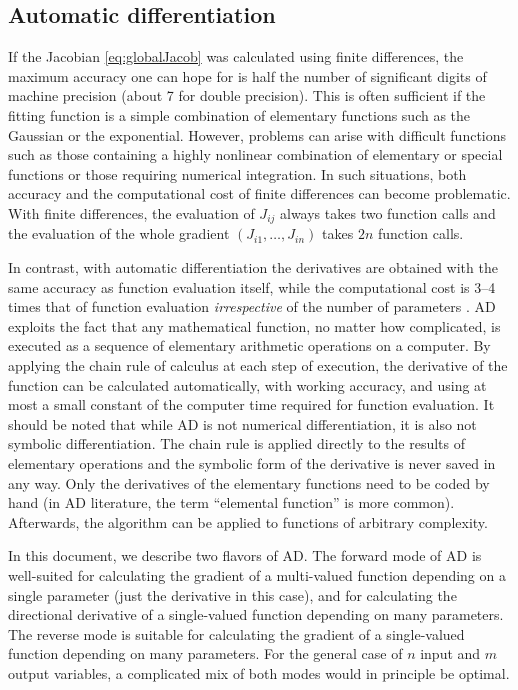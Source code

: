 \documentclass{article}
\begin{document}
\subsection{\label{sec:ad}Automatic differentiation}

If the Jacobian \eqref{eq:globalJacob} was calculated using finite
differences, the maximum accuracy one can hope for is half the number
of significant digits of machine precision (about 7 for double
precision). This is often sufficient if the fitting function is a
simple combination of elementary functions such as the Gaussian or the
exponential. However, problems can arise with difficult functions such
as those containing a highly nonlinear combination of elementary or
special functions or those requiring numerical integration. In such
situations, both accuracy and the computational cost of finite
differences can become problematic. With finite differences, the
evaluation of $J_{ij}$ always takes two function calls and the
evaluation of the whole gradient $(J_{i1}, \ldots, J_{in})$ takes $2n$
function calls.

In contrast, with automatic differentiation the derivatives are
obtained with the same accuracy as function evaluation itself, while
the computational cost is 3--4 times that of function evaluation
\textit{irrespective} of the number of parameters
\cite{griewank08}. AD exploits the fact that any mathematical
function, no matter how complicated, is executed as a sequence of
elementary arithmetic operations on a computer. By applying the chain
rule of calculus at each step of execution, the derivative of the
function can be calculated automatically, with working accuracy, and
using at most a small constant of the computer time required for
function evaluation. It should be noted that while AD is not numerical
differentiation, it is also not symbolic differentiation. The chain
rule is applied directly to the results of elementary operations and
the symbolic form of the derivative is never saved in any way. Only
the derivatives of the elementary functions need to be coded by hand
(in AD literature, the term ``elemental function'' is more
common). Afterwards, the algorithm can be applied to functions of
arbitrary complexity.

In this document, we describe two flavors of AD. The forward mode of
AD is well-suited for calculating the gradient of a multi-valued
function depending on a single parameter (just the derivative in this
case), and for calculating the directional derivative of a
single-valued function depending on many parameters. The reverse mode
is suitable for calculating the gradient of a single-valued function
depending on many parameters. For the general case of $n$ input and
$m$ output variables, a complicated mix of both modes would in
principle be optimal.
\end{document}
